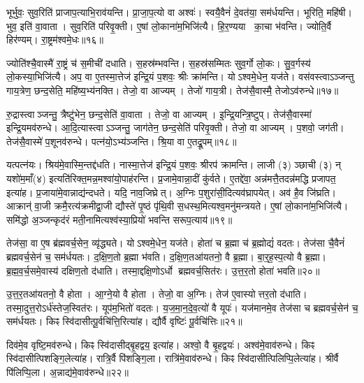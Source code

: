 भूर्भुवः॒ सुव॒रिति॑ प्राजाप॒त्याभि॒राव॑यन्ति।
प्रा॒जा॒प॒त्यो वा अश्वः॑।
स्वयै॒वैनं॑ दे॒वत॑या॒ सम॑र्धयन्ति।
भूरिति॒ महि॑षी।
भुव॒ इति॑ वा॒वाता।
सुव॒रिति॑ परिवृ॒क्ती।
ए॒षां लो॒काना॑म॒भिजि॑त्यै।
हि॒र॒ण्यया का॒चा भ॑वन्ति।
ज्योति॒र्वै हिर॑ण्यम्।
रा॒ष्ट्रम॑श्वमे॒धः॥१६॥

ज्योति॑श्चै॒वास्मै॑ रा॒ष्ट्रं च॑ स॒मीची॑ दधाति।
स॒हस्र॑म्भवन्ति।
स॒हस्र॑सम्मितः सुव॒र्गो लो॒कः।
सु॒व॒र्गस्य॑ लो॒कस्या॒भिजि॑त्यै।
अप॒ वा ए॒तस्मा॒त्तेज॑ इन्द्रि॒यं प॒शवः॒ श्रीः क्रा॑मन्ति।
योऽश्वमे॒धेन॒ यज॑ते।
वस॑वस्त्वा\-ऽञ्जन्तु गाय॒त्रेण॒ छन्द॒सेति॒ महि॑ष्य॒भ्य॑नक्ति।
तेजो॒ वा आज्यम्।
तेजो॑ गाय॒त्री।
तेज॑सै॒वास्मै॒ तेजो\-ऽव॑रुन्धे॥१७॥

रु॒द्रास्त्वाञ्जन्तु॒ त्रैष्टु॑भेन॒ छन्द॒सेति॑ वा॒वाता।
तेजो॒ वा आज्यम्।
इ॒न्द्रि॒यन्त्रि॒ष्टुप्।
तेज॑सै॒वास्मा॑ इन्द्रि॒यमव॑रुन्धे।
आ॒दि॒त्यास्त्वा\-ऽञ्जन्तु॒ जाग॑तेन॒ छन्द॒सेति॑ परिवृ॒क्ती।
तेजो॒ वा आज्यम्।
प॒शवो॒ जग॑ती।
तेज॑सै॒वास्मे॑ प॒शूनव॑रुन्धे।
पत्न॑यो॒\-ऽभ्य॑ञ्जन्ति।
श्रि॒या वा ए॒तद्रू॒पम्॥१८॥

यत्पत्न॑यः।
श्रिय॑मे॒वास्मि॒न्तद्द॑धति।
नास्मा॒त्तेज॑ इन्द्रि॒यं प॒शवः॒ श्रीरप॑ क्रामन्ति।
लाजी (३) ञ्छाची (३) न् यशो॑म॒माँ(४) इत्यति॑रिक्त॒मन्न॒मश्वा॑यो॒पाह॑रन्ति।
प्र॒जामे॒वान्ना॒दीं कु॑र्वते।
ए॒तद्दे॑वा॒ अन्न॑मत्तै॒तदन्न॑मद्धि प्रजापत॒ इत्या॑ह।
प्र॒जाया॑मे॒वान्नाद्य॑न्दधते।
यदि॒ नाव॒जिघ्रेत्।
अ॒ग्निः प॒शुरा॑सी॒दित्यव॑घ्रापयेत्।
अव॑ है॒व जि॑घ्रति।
आक्रान्॑ वा॒जी क्रमै॒रत्य॑क्रमीद्वा॒जी द्यौस्ते॑ पृ॒ष्ठं पृ॑थि॒वी स॒धस्थ॒मित्यश्व॒मनु॑मन्त्रयते।
ए॒षां लो॒काना॑म॒भिजि॑त्यै।
समि॑द्धो अ॒ञ्जन्कृद॑रं मती॒नामित्यश्व॑स्या॒प्रियो॑ भवन्ति सरूप॒त्याय॑॥१९॥\anuvakamend[परि॑त॒स्थुष॒ इत्या॑हे॒मे ए॒वास्मै॑ युनक्त्य॒भिजि॑त्यै भरन्त्यश्वमे॒धो रु॑न्धे रू॒पञ्जि॑घ्रति॒ त्रीणि॑ च]

तेज॑सा॒ वा ए॒ष ब्र॑ह्मवर्च॒सेन॒ व्यृ॑द्ध्यते।
योऽश्वमे॒धेन॒ यज॑ते।
होता॑ च ब्र॒ह्मा च॑ ब्र॒ह्मोद्यं॑ वदतः।
तेज॑सा चै॒वैनं॑ ब्रह्मवर्च॒सेन॑ च॒ सम॑र्धयतः।
द॒क्षि॒ण॒तो ब्र॒ह्मा भ॑वति।
द॒क्षि॒ण॒तआ॑यतनो॒ वै ब्र॒ह्मा।
बा॒र्॒ह॒स्प॒त्यो वै ब्र॒ह्मा।
ब्र॒ह्म॒व॒र्च॒समे॒वास्य॑ दक्षिण॒तो द॑धाति।
तस्मा॒द्दक्षि॒णो\-ऽर्धो ब्रह्मवर्च॒सित॑रः।
उ॒त्त॒र॒तो होता॑ भवति॥२०॥

उ॒त्त॒र॒तआ॑यतनो॒ वै होता।
आ॒ग्ने॒यो वै होता।
तेजो॒ वा अ॒ग्निः।
तेज॑ ए॒वास्योत्तर॒तो द॑धाति।
तस्मा॒दुत्त॒रो\-ऽर्ध॑स्तेज॒स्वित॑रः।
यूप॑म॒भितो॑ वदतः।
य॒ज॒मा॒न॒दे॒व॒त्यो॑ वै यूपः॑।
यज॑मानमे॒व तेज॑सा च ब्रह्मवर्च॒सेन॑ च॒ सम॑र्धयतः।
किꣴ स्वि॑दासीत्पू॒र्वचि॑त्ति॒रित्या॑ह।
द्यौर्वै वृष्टिः॑ पू॒र्वचि॑त्तिः॥२१॥

दिव॑मे॒व वृष्टि॒मव॑रुन्धे।
किꣴ स्वि॑दासीद्बृ॒हद्वय॒ इत्या॑ह।
अश्वो॒ वै बृ॒हद्वयः॑।
अश्व॑मे॒वाव॑रुन्धे।
किꣴ स्वि॑दासीत्पिशङ्गि॒लेत्या॑ह।
रात्रि॒र्वै पि॑शङ्गि॒ला।
रात्रि॑मे॒वाव॑रुन्धे।
किꣴ स्वि॑दासीत्पिलिप्पि॒लेत्या॑ह।
श्रीर्वै पि॑लिप्पि॒ला।
अ॒न्नाद्य॑मे॒वाव॑रुन्धे॥२२॥

